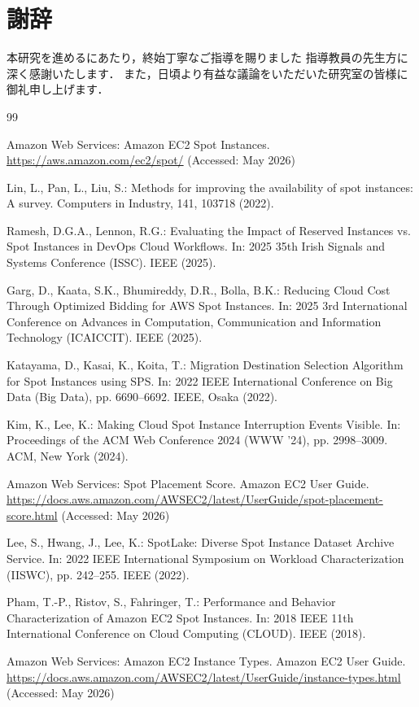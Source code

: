 \documentclass[11pt,a4paper]{ltjsreport}
\begin{document}
\chapter*{謝辞}

本研究を進めるにあたり，終始丁寧なご指導を賜りました
指導教員の先生方に深く感謝いたします．
また，日頃より有益な議論をいただいた研究室の皆様に御礼申し上げます．

\begin{thebibliography}{99}

Amazon Web Services:
Amazon EC2 Spot Instances.
\url{https://aws.amazon.com/ec2/spot/}
(Accessed: May 2026)

Lin, L., Pan, L., Liu, S.:
Methods for improving the availability of spot instances: A survey.
Computers in Industry, 141, 103718 (2022).

Ramesh, D.G.A., Lennon, R.G.:
Evaluating the Impact of Reserved Instances vs. Spot Instances in DevOps Cloud Workflows.
In: 2025 35th Irish Signals and Systems Conference (ISSC). IEEE (2025).

Garg, D., Kaata, S.K., Bhumireddy, D.R., Bolla, B.K.:
Reducing Cloud Cost Through Optimized Bidding for AWS Spot Instances.
In: 2025 3rd International Conference on Advances in Computation,
Communication and Information Technology (ICAICCIT). IEEE (2025).

Katayama, D., Kasai, K., Koita, T.:
Migration Destination Selection Algorithm for Spot Instances using SPS.
In: 2022 IEEE International Conference on Big Data (Big Data),
pp. 6690--6692. IEEE, Osaka (2022).

Kim, K., Lee, K.:
Making Cloud Spot Instance Interruption Events Visible.
In: Proceedings of the ACM Web Conference 2024 (WWW '24),
pp. 2998--3009. ACM, New York (2024).

Amazon Web Services:
Spot Placement Score. Amazon EC2 User Guide.
\url{https://docs.aws.amazon.com/AWSEC2/latest/UserGuide/spot-placement-score.html}
(Accessed: May 2026)

Lee, S., Hwang, J., Lee, K.:
SpotLake: Diverse Spot Instance Dataset Archive Service.
In: 2022 IEEE International Symposium on Workload Characterization (IISWC),
pp. 242--255. IEEE (2022).

Pham, T.-P., Ristov, S., Fahringer, T.:
Performance and Behavior Characterization of Amazon EC2 Spot Instances.
In: 2018 IEEE 11th International Conference on Cloud Computing (CLOUD).
IEEE (2018).

Amazon Web Services:
Amazon EC2 Instance Types. Amazon EC2 User Guide.
\url{https://docs.aws.amazon.com/AWSEC2/latest/UserGuide/instance-types.html}
(Accessed: May 2026)

\end{thebibliography}
\end{document}
